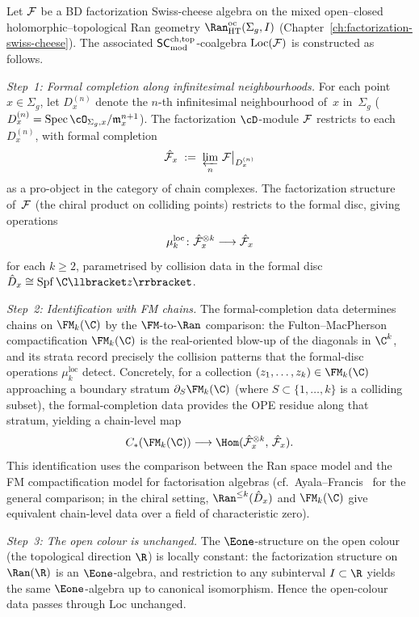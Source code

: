 \begin{construction}
\label{con:extraction-functor}
Let $\mathcal{F}$ be a BD factorization Swiss-cheese algebra on the mixed
open--closed holomorphic--topological Ran geometry
$\Ran^{\mathrm{oc}}_{\mathrm{HT}}(\Sigma_g,I)$
(Chapter~\ref{ch:factorization-swiss-cheese}). The associated
$\mathsf{SC}^{\mathrm{ch,top}}_{\mathrm{mod}}$-coalgebra $\mathrm{Loc}(\mathcal{F})$ is constructed as follows.

\medskip\noindent
\emph{Step~1: Formal completion along infinitesimal neighbourhoods.}
For each point $x \in \Sigma_g$, let $D_x^{(n)}$ denote the
$n$-th infinitesimal neighbourhood of~$x$ in~$\Sigma_g$
($D_x^{(n)} = \operatorname{Spec} \cO_{\Sigma_g,x}/\mathfrak{m}_x^{n+1}$).
The factorization $\cD$-module $\mathcal{F}$ restricts to each
$D_x^{(n)}$, with formal completion
\[
 \hat{\mathcal{F}}_x
 \;:=\;
 \varprojlim_n \, \mathcal{F}\big|_{D_x^{(n)}}
\]
as a pro-object in the category of chain complexes. The
factorization structure of~$\mathcal{F}$ (the chiral product
on colliding points) restricts to the formal disc,
giving operations
\[
 \mu_k^{\mathrm{loc}} \colon
 \hat{\mathcal{F}}_x^{\otimes k}
 \longrightarrow
 \hat{\mathcal{F}}_x
\]
for each $k \ge 2$, parametrised by collision data in the
formal disc $\hat{D}_x \cong \operatorname{Spf} \C\llbracket z \rrbracket$.

\medskip\noindent
\emph{Step~2: Identification with FM chains.}
The formal-completion data determines chains on
$\FM_k(\C)$ by the $\FM$-to-$\Ran$ comparison: the
Fulton--MacPherson compactification $\FM_k(\C)$ is the
real-oriented blow-up of the diagonals in $\C^k$, and
its strata record precisely the collision patterns that
the formal-disc operations $\mu_k^{\mathrm{loc}}$ detect.
Concretely, for a collection
$(z_1, \ldots, z_k) \in \FM_k(\C)$ approaching a
boundary stratum $\partial_S \FM_k(\C)$
(where $S \subset \{1, \ldots, k\}$ is a colliding subset),
the formal-completion data provides the OPE residue
along that stratum, yielding a chain-level map
\[
 C_\ast(\FM_k(\C))
 \longrightarrow
 \Hom(\hat{\cF}_x^{\otimes k},\, \hat{\cF}_x).
\]
This identification uses the comparison between the
Ran space model and the FM compactification model for
factorisation algebras
(cf.~Ayala--Francis~\cite{AF15} for the general
comparison; in the chiral setting,
$\Ran^{\le k}(\hat{D}_x)$ and $\FM_k(\C)$ give
equivalent chain-level data over a field of
characteristic zero).

\medskip\noindent
\emph{Step~3: The open colour is unchanged.}
The $\Eone$-structure on the open colour (the topological
direction $\R$) is locally constant: the factorization
structure on $\Ran(\R)$ is an $\Eone$-algebra, and
restriction to any subinterval $I \subset \R$ yields the
same $\Eone$-algebra up to canonical isomorphism. Hence
the open-colour data passes through $\mathrm{Loc}$
unchanged.


\end{construction}
